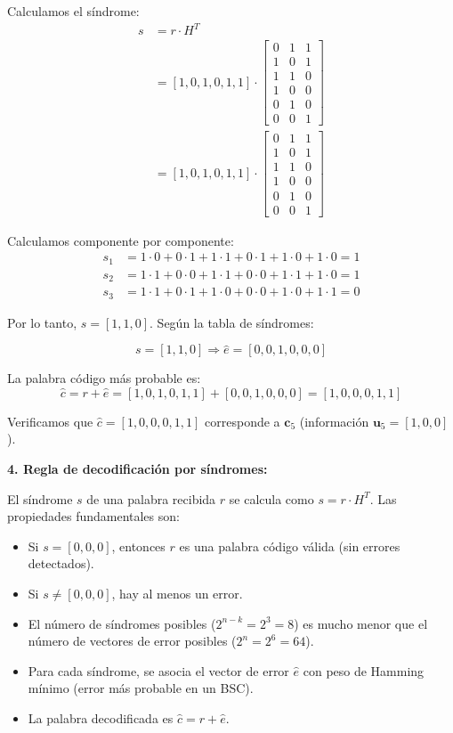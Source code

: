 \documentclass[10pt,a4paper]{article}
\begin{document}
\begin{solucion}
Calculamos el síndrome:
\begin{align*}
s &= r \cdot H^T \\
&= [1,0,1,0,1,1] \cdot \begin{bmatrix}
0 & 1 & 1 \\
1 & 0 & 1 \\
1 & 1 & 0 \\
1 & 0 & 0 \\
0 & 1 & 0 \\
0 & 0 & 1
\end{bmatrix} \\
&= [1,0,1,0,1,1] \cdot \begin{bmatrix}
0 & 1 & 1 \\
1 & 0 & 1 \\
1 & 1 & 0 \\
1 & 0 & 0 \\
0 & 1 & 0 \\
0 & 0 & 1
\end{bmatrix}
\end{align*}

Calculamos componente por componente:
\begin{align*}
s_1 &= 1 \cdot 0 + 0 \cdot 1 + 1 \cdot 1 + 0 \cdot 1 + 1 \cdot 0 + 1 \cdot 0 = 1 \\
s_2 &= 1 \cdot 1 + 0 \cdot 0 + 1 \cdot 1 + 0 \cdot 0 + 1 \cdot 1 + 1 \cdot 0 = 1 \\
s_3 &= 1 \cdot 1 + 0 \cdot 1 + 1 \cdot 0 + 0 \cdot 0 + 1 \cdot 0 + 1 \cdot 1 = 0
\end{align*}

Por lo tanto, $s = [1,1,0]$. Según la tabla de síndromes:

\[
s = [1,1,0] \Rightarrow \hat{e} = [0,0,1,0,0,0]
\]

La palabra código más probable es:
\[
\hat{c} = r + \hat{e} = [1,0,1,0,1,1] + [0,0,1,0,0,0] = [1,0,0,0,1,1]
\]

Verificamos que $\hat{c} = [1,0,0,0,1,1]$ corresponde a $\mathbf{c}_5$ (información $\mathbf{u}_5 = [1,0,0]$).

\textbf{4. Regla de decodificación por síndromes:}

El síndrome $s$ de una palabra recibida $r$ se calcula como $s = r \cdot H^T$. Las propiedades fundamentales son:

\begin{itemize}
\item Si $s = [0,0,0]$, entonces $r$ es una palabra código válida (sin errores detectados).
\item Si $s \neq [0,0,0]$, hay al menos un error.
\item El número de síndromes posibles ($2^{n-k} = 2^3 = 8$) es mucho menor que el número de vectores de error posibles ($2^n = 2^6 = 64$).
\item Para cada síndrome, se asocia el vector de error $\hat{e}$ con peso de Hamming mínimo (error más probable en un BSC).
\item La palabra decodificada es $\hat{c} = r + \hat{e}$.
\end{itemize}


\end{solucion}
\end{document}

